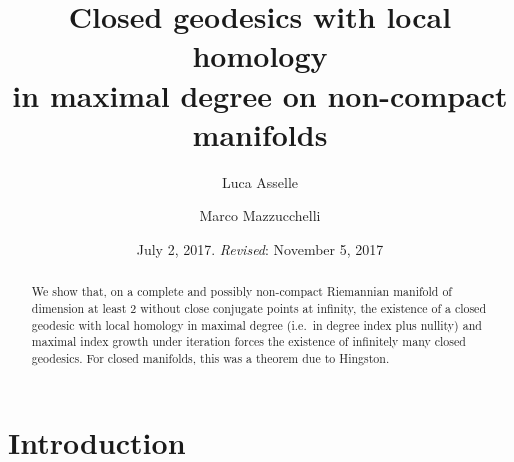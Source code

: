 \documentclass[reqno]{amsart}
\numberwithin{equation}{section}
\theoremstyle{personal}%
\theoremstyle{definition}
\begin{document}
\title[Closed geodesics with local homology in maximal degree]{Closed geodesics with local homology\\ in maximal degree on non-compact manifolds}
\author{Luca Asselle}
\address{Luca Asselle\newline\indent Ruhr Universit\"at Bochum, Fakult\"at f\"ur Mathematik\newline\indent Geb\"aude NA 4/33, D-44801 Bochum, Germany}
\author{Marco Mazzucchelli}
\address{Marco Mazzucchelli\newline\indent CNRS, \'Ecole Normale Sup\'erieure de Lyon, UMPA\newline{} Lyon Cedex 07, France}
\date{July 2, 2017. \emph{Revised}: November 5, 2017}

\begin{abstract}
We show that, on a complete and possibly non-compact  Riemannian manifold of dimension at least 2 without close conjugate points at infinity, the existence of a closed geodesic with local homology in maximal degree (i.e.\ in degree index plus nullity) and maximal index growth under iteration forces the existence of infinitely many closed geodesics. For closed manifolds, this was a theorem due to Hingston.
\tableofcontents
\end{abstract}
\maketitle

\vspace{-20pt}

\section{Introduction}
\end{document}
